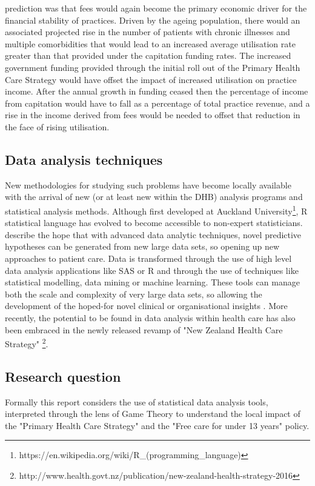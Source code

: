 \documentclass[11pt,a4paper]{article}
\begin{document}
\citet{howell2005restructuring} prediction was that fees would again become the primary economic driver for the financial stability of practices. Driven by the ageing population, there would an associated projected rise in the number of patients with chronic illnesses and multiple comorbidities that would lead to an increased  average utilisation rate greater than that provided under the capitation funding rates. The increased government funding provided through the initial roll out of the Primary Health Care Strategy would have offset the impact of increased utilisation on practice income. After the annual growth in funding ceased then the percentage of income from capitation would have to fall as a percentage of total practice revenue, and a rise in the income derived from fees  would be needed to offset that reduction in the face of rising utilisation.\\


\subsection{Data analysis techniques}
New methodologies for studying such problems have become locally available with the arrival of new (or at least new within the DHB) analysis programs and statistical analysis methods. Although first developed at Auckland University\footnote{https://en.wikipedia.org/wiki/R\_(programming\_language)}, R statistical language has evolved to become accessible to non-expert statisticians. \citet{khoury2014big} describe the hope that with advanced data analytic techniques,  novel predictive hypotheses can be generated from new large data sets, so opening up new approaches to patient care. Data is transformed through the use of high level data analysis applications like SAS or R and through the use of techniques like statistical modelling, data mining or machine learning. These tools can manage both the scale and complexity of very large data sets, so allowing the development of the  hoped-for novel clinical or organisational insights \citep{reshef2011detecting}.  More recently, the potential to be found in data analysis within health care has also been embraced in the newly released revamp of "New Zealand Health Care Strategy" \footnote{http://www.health.govt.nz/publication/new-zealand-health-strategy-2016}. \\


\subsection{Research question}
Formally this report considers the use of statistical data analysis tools, interpreted through the lens of Game Theory to understand the local impact of the "Primary Health Care Strategy" and the "Free care for under 13 years" policy. \\ 
\end{document}
